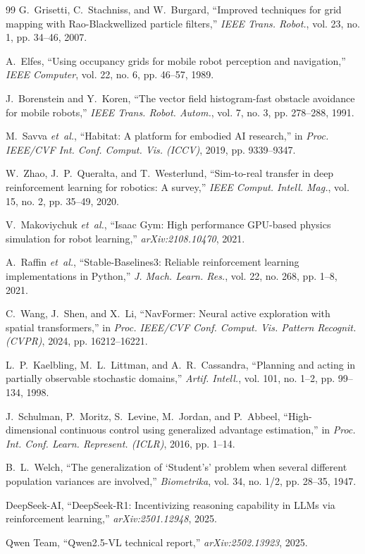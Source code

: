 \documentclass[conference]{IEEEtran}
\begin{document}
\begin{thebibliography}{99}
G.~Grisetti, C.~Stachniss, and W.~Burgard, ``Improved techniques for grid mapping with Rao-Blackwellized particle filters,'' \textit{IEEE Trans. Robot.}, vol. 23, no. 1, pp. 34--46, 2007.

A.~Elfes, ``Using occupancy grids for mobile robot perception and navigation,'' \textit{IEEE Computer}, vol. 22, no. 6, pp. 46--57, 1989.

J.~Borenstein and Y.~Koren, ``The vector field histogram-fast obstacle avoidance for mobile robots,'' \textit{IEEE Trans. Robot. Autom.}, vol. 7, no. 3, pp. 278--288, 1991.

M.~Savva \textit{et~al.}, ``Habitat: A platform for embodied AI research,'' in \textit{Proc. IEEE/CVF Int. Conf. Comput. Vis. (ICCV)}, 2019, pp. 9339--9347.

W.~Zhao, J.~P.~Queralta, and T.~Westerlund, ``Sim-to-real transfer in deep reinforcement learning for robotics: A survey,'' \textit{IEEE Comput. Intell. Mag.}, vol. 15, no. 2, pp. 35--49, 2020.

V.~Makoviychuk \textit{et~al.}, ``Isaac Gym: High performance GPU-based physics simulation for robot learning,'' \textit{arXiv:2108.10470}, 2021.

A.~Raffin \textit{et~al.}, ``Stable-Baselines3: Reliable reinforcement learning implementations in Python,'' \textit{J. Mach. Learn. Res.}, vol. 22, no. 268, pp. 1--8, 2021.

C.~Wang, J.~Shen, and X.~Li, ``NavFormer: Neural active exploration with spatial transformers,'' in \textit{Proc. IEEE/CVF Conf. Comput. Vis. Pattern Recognit. (CVPR)}, 2024, pp. 16212--16221.

L.~P.~Kaelbling, M.~L.~Littman, and A.~R.~Cassandra, ``Planning and acting in partially observable stochastic domains,'' \textit{Artif. Intell.}, vol. 101, no. 1--2, pp. 99--134, 1998.

J.~Schulman, P.~Moritz, S.~Levine, M.~Jordan, and P.~Abbeel, ``High-dimensional continuous control using generalized advantage estimation,'' in \textit{Proc. Int. Conf. Learn. Represent. (ICLR)}, 2016, pp. 1--14.

B.~L.~Welch, ``The generalization of `Student's' problem when several different population variances are involved,'' \textit{Biometrika}, vol. 34, no. 1/2, pp. 28--35, 1947.

DeepSeek-AI, ``DeepSeek-R1: Incentivizing reasoning capability in LLMs via reinforcement learning,'' \textit{arXiv:2501.12948}, 2025.

Qwen Team, ``Qwen2.5-VL technical report,'' \textit{arXiv:2502.13923}, 2025.

\end{thebibliography}
\end{document}
